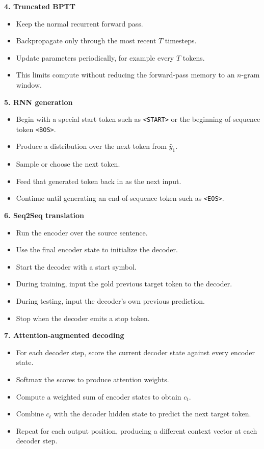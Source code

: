 \documentclass[11pt]{article}
\begin{document}
\textbf{4. Truncated BPTT}
\begin{itemize}
    \item Keep the normal recurrent forward pass.
    \item Backpropagate only through the most recent \(T\) timesteps.
    \item Update parameters periodically, for example every \(T\) tokens.
    \item This limits compute without reducing the forward-pass memory to an \(n\)-gram window.
\end{itemize}

\textbf{5. RNN generation}
\begin{itemize}
    \item Begin with a special start token such as \texttt{<START>} or the beginning-of-sequence token \texttt{<BOS>}.
    \item Produce a distribution over the next token from \(\hat{y}_1\).
    \item Sample or choose the next token.
    \item Feed that generated token back in as the next input.
    \item Continue until generating an end-of-sequence token such as \texttt{<EOS>}.
\end{itemize}

\textbf{6. Seq2Seq translation}
\begin{itemize}
    \item Run the encoder over the source sentence.
    \item Use the final encoder state to initialize the decoder.
    \item Start the decoder with a start symbol.
    \item During training, input the gold previous target token to the decoder.
    \item During testing, input the decoder's own previous prediction.
    \item Stop when the decoder emits a stop token.
\end{itemize}

\textbf{7. Attention-augmented decoding}
\begin{itemize}
    \item For each decoder step, score the current decoder state against every encoder state.
    \item Softmax the scores to produce attention weights.
    \item Compute a weighted sum of encoder states to obtain \(c_t\).
    \item Combine \(c_t\) with the decoder hidden state to predict the next target token.
    \item Repeat for each output position, producing a different context vector at each decoder step.
\end{itemize}
\end{document}
